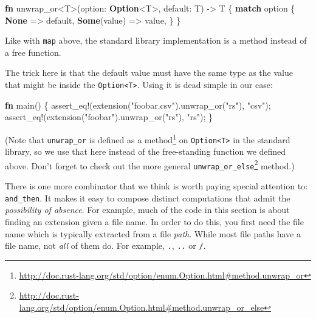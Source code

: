 \documentclass[a4paper,]{book}
\newenvironment{Shaded}{\begin{snugshade}}{\end{snugshade}}
\newcommand{\KeywordTok}[1]{\textcolor[rgb]{0.13,0.29,0.53}{\textbf{{#1}}}}
\newcommand{\StringTok}[1]{\textcolor[rgb]{0.31,0.60,0.02}{{#1}}}
\newcommand{\OtherTok}[1]{\textcolor[rgb]{0.56,0.35,0.01}{{#1}}}
\newcommand{\NormalTok}[1]{{#1}}
\renewcommand{\href}[2]{#2\footnote{\url{#1}}}
\begin{document}
\begin{Shaded}
\begin{Highlighting}[]
\KeywordTok{fn} \NormalTok{unwrap_or<T>(option: }\KeywordTok{Option}\NormalTok{<T>, default: T) -> T \{}
    \KeywordTok{match} \NormalTok{option \{}
        \KeywordTok{None} \NormalTok{=> default,}
        \KeywordTok{Some}\NormalTok{(value) => value,}
    \NormalTok{\}}
\NormalTok{\}}
\end{Highlighting}
\end{Shaded}

Like with \texttt{map} above, the standard library implementation is a
method instead of a free function.

The trick here is that the default value must have the same type as the
value that might be inside the
\texttt{Option\textless{}T\textgreater{}}. Using it is dead simple in
our case:

\begin{Shaded}
\begin{Highlighting}[]
\KeywordTok{fn} \NormalTok{main() \{}
    \OtherTok{assert_eq!}\NormalTok{(extension(}\StringTok{"foobar.csv"}\NormalTok{).unwrap_or(}\StringTok{"rs"}\NormalTok{), }\StringTok{"csv"}\NormalTok{);}
    \OtherTok{assert_eq!}\NormalTok{(extension(}\StringTok{"foobar"}\NormalTok{).unwrap_or(}\StringTok{"rs"}\NormalTok{), }\StringTok{"rs"}\NormalTok{);}
\NormalTok{\}}
\end{Highlighting}
\end{Shaded}

(Note that \texttt{unwrap\_or} is
\href{http://doc.rust-lang.org/std/option/enum.Option.html\#method.unwrap_or}{defined
as a method} on \texttt{Option\textless{}T\textgreater{}} in the
standard library, so we use that here instead of the free-standing
function we defined above. Don't forget to check out the more general
\href{http://doc.rust-lang.org/std/option/enum.Option.html\#method.unwrap_or_else}{\texttt{unwrap\_or\_else}}
method.)

There is one more combinator that we think is worth paying special
attention to: \texttt{and\_then}. It makes it easy to compose distinct
computations that admit the \emph{possibility of absence}. For example,
much of the code in this section is about finding an extension given a
file name. In order to do this, you first need the file name which is
typically extracted from a file \emph{path}. While most file paths have
a file name, not \emph{all} of them do. For example, \texttt{.},
\texttt{..} or \texttt{/}.
\end{document}
